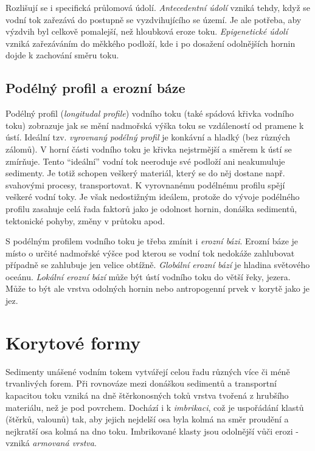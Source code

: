 Rozlišují se i specifická průlomová údolí. \emph{Antecedentní údolí} vzniká tehdy, když se vodní tok zařezává do postupně se vyzdvihujícího se území. Je ale potřeba, aby výzdvih byl celkově pomalejší, než hloubková eroze toku. \emph{Epigenetické údolí} vzniká zařezáváním do měkkého podloží, kde i po dosažení odolnějších hornin dojde k zachování směru toku. 


\subsection{Podélný profil a erozní báze}
Podélný profil (\textit{longitudal profile}) vodního toku (také spádová křivka vodního toku) zobrazuje jak se mění nadmořská výška toku se vzdáleností od pramene k ústí. Ideální tzv. \emph{vyrovnaný podélný profil} je konkávní a hladký (bez různých zálomů). V horní části vodního toku je křivka nejstrmější a směrem k ústí se zmírňuje. Tento \enquote{ideální} vodní tok neeroduje své podloží ani neakumuluje sedimenty. Je totiž schopen veškerý materiál, který se do něj dostane např. svahovými procesy, transportovat. K vyrovnanému podélnému profilu spějí veškeré vodní toky. Je však nedostižným ideálem, protože do vývoje podélného profilu zasahuje celá řada faktorů jako je odolnost hornin, donáška sedimentů, tektonické pohyby, změny v průtoku apod. 

S podélným profilem vodního toku je třeba zmínit i \emph{erozní bázi}. Erozní báze je místo o určité nadmořské výšce pod kterou se vodní tok nedokáže zahlubovat případně se zahlubuje jen velice obtížně. \emph{Globální erozní bází} je hladina světového oceánu. \emph{Lokální erozní bází} může být ústí vodního toku do větší řeky, jezera. Může to být ale vrstva odolných hornin nebo antropogenní prvek v korytě jako je jez.





\section{Korytové formy}
Sedimenty unášené vodním tokem vytvářejí celou řadu různých více či méně trvanlivých forem. Při rovnováze mezi donáškou sedimentů a transportní kapacitou toku vzniká na dně štěrkonosných toků vrstva tvořená z hrubšího materiálu, než je pod povrchem. Dochází i k \emph{imbrikaci}, což je uspořádání klastů (štěrků, valounů) tak, aby jejich nejdelší osa byla kolmá na směr proudění a nejkratší osa kolmá na dno toku. Imbrikované klasty jsou odolnější vůči erozi - vzniká \emph{armovaná vrstva}.

